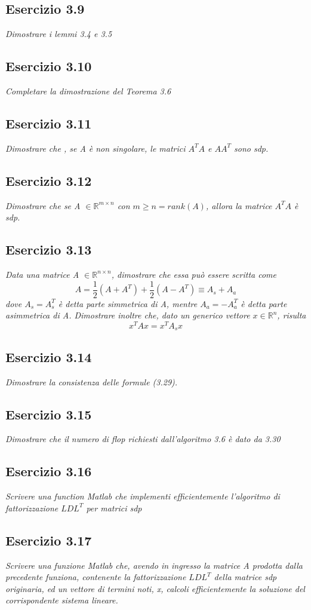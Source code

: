 \subsection{Esercizio 3.9}
\emph{Dimostrare i lemmi 3.4 e 3.5}
\subsection{Esercizio 3.10}
\emph{Completare la dimostrazione del Teorema 3.6}
\subsection{Esercizio 3.11}
\emph{Dimostrare che , se A è non singolare, le matrici $A^{T}A$ e $AA^{T}$ sono sdp.}
\subsection{Esercizio 3.12}
\emph{Dimostrare che se A $\in \mathbb{R}^{m \times n} $ con $ m \geq n = rank(A)$, allora la matrice $A^{T} A$ è sdp.}
\subsection{Esercizio 3.13}
\emph{Data una matrice A $\in \mathbb{R}^{n \times n} $, dimostrare che essa può essere scritta come
$$A = \frac{1}{2} (A+A^{T})+\frac{1}{2} (A-A^{T}) \equiv A_{s} + A_{a}$$
dove $ A_{s} = A_{s}^{T} $ è detta parte simmetrica di A, mentre $A_{a} = - A^{T}_{a} $ è detta parte asimmetrica di A. Dimostrare inoltre che, dato un generico vettore $ x \in \mathbb{R}^{n}$, risulta} $$ x^{T} Ax = x^{T} A_{s} x $$
 \subsection{Esercizio 3.14}
\emph{Dimostrare la consistenza delle formule (3.29).}
\subsection{Esercizio 3.15}
\emph{Dimostrare che il numero di flop richiesti dall'algoritmo 3.6 è dato da 3.30 }
\subsection{Esercizio 3.16}
\emph{Scrivere una function Matlab che implementi efficientemente l'algoritmo di fattorizzazione $LDL^{T}$ per matrici sdp}
\subsection{Esercizio 3.17}
\emph{Scrivere una funzione Matlab che, avendo in ingresso la matrice A prodotta dalla precedente funziona, contenente la fattorizzazione $LDL^{T}$ della matrice sdp originaria, ed un vettore di termini noti, x, calcoli efficientemente la soluzione del corrispondente sistema lineare.}
